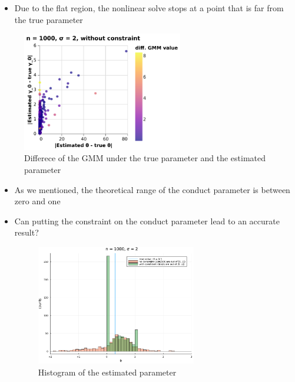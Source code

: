 \documentclass[aspectratio = 169]{beamer}
\theoremstyle{definition}
\begin{document}
\begin{frame}{}
    \begin{itemize}
        \item Due to the flat region, the nonlinear solve stops at a point that is far from the true parameter
    \end{itemize}
    \begin{figure}
        \centering
        \includegraphics[width = 7cm]{figuretable/diff_gmm_value_loglinear_loglinear_n_1000_sigma_2_non_constraint.pdf}
        \caption{Differece of the GMM under the true parameter and the estimated parameter}
        \label{fig:gmm_diff}
    \end{figure}
\end{frame}


\begin{frame}{}
    \begin{itemize}
        \item As we mentioned, the theoretical range of the conduct parameter is between zero and one
        \item Can putting the constraint on the conduct parameter lead to an accurate result?
        \begin{figure}
            \centering
            \includegraphics[width = 7cm]{figuretable/histogram_loglinear_loglinear_n_1000_sigma_2_theta_constraint.pdf}
            \caption{Histogram of the estimated parameter}
            \label{fig:histogram_theta  }
        \end{figure}
    \end{itemize}
\end{frame}
\end{document}

